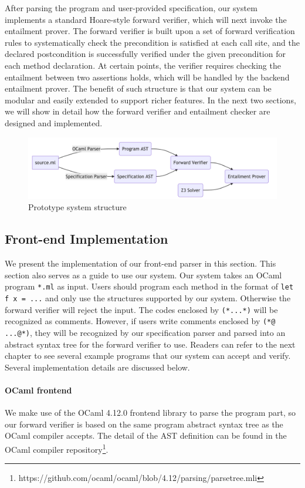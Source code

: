 After parsing the program and user-provided specification, our system
implements a standard Hoare-style forward verifier, which will next invoke
the entailment prover. The forward verifier is built upon a set of forward
verification rules to systematically check the precondition is satisfied at
each call site, and the declared postcondition is successfully verified
under the given precondition for each method declaration. At certain points,
the verifier requires checking the entailment between two assertions holds, 
which will be handled by the backend entailment prover. The benefit of 
such structure is that our system can be modular and easily extended 
to support richer features. In the next two sections, we will show in 
detail how the forward verifier and entailment checker are designed
and implemented.

\begin{figure}
    \centering
    \includegraphics[width=0.8\linewidth]{report/pic/ch-Design/structure.png}
    \caption{Prototype system structure}
    \label{fig:structure}
\end{figure}

\subsection{Front-end Implementation}

We present the implementation of our front-end parser in this section. This section also serves as a guide to use our system. Our system takes an OCaml program \texttt{*.ml} as input. Users should program each method in the format of \texttt{let f x = ...} and only use the structures supported by our system. Otherwise the forward verifier will reject the input. The codes enclosed by \texttt{(*...*)} will be recognized as comments. However, if users write comments enclosed by \texttt{(*@ ...@*)}, they will be recognized by our specification parser and parsed into an abstract syntax tree for the forward verifier to use. Readers can refer to the next chapter to see several example programs that our system can accept and verify. Several implementation details are discussed below.

\paragraph{OCaml frontend} We make use of the OCaml 4.12.0 frontend library to parse the program part, so our forward verifier is based on the same program abstract syntax tree as the OCaml compiler accepts. The detail of the AST definition can be found in the OCaml compiler repository\footnote{https://github.com/ocaml/ocaml/blob/4.12/parsing/parsetree.mli}.

